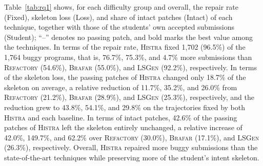 \documentclass[10pt,conference]{IEEEtran}
\begin{document}
Table~\ref{tab:rq1} shows, for each difficulty group and overall, the repair rate (Fixed), skeleton loss (Loss), and share of intact patches (Intact) of each technique, together with those of the students' own accepted submissions (Student); ``--'' denotes no passing patch, and bold marks the best value among the techniques. In terms of the repair rate, \textsc{Histra} fixed 1,702 (96.5\%) of the 1,764 buggy programs, that is, 76.7\%, 75.3\%, and 4.7\% more submissions than \textsc{Refactory} (54.6\%), \textsc{Brafar} (55.0\%), and \textsc{LSGen} (92.2\%), respectively. In terms of the skeleton loss, the passing patches of \textsc{Histra} changed only 18.7\% of the skeleton on average, a relative reduction of 11.7\%, 35.2\%, and 26.0\% from \textsc{Refactory} (21.2\%), \textsc{Brafar} (28.9\%), and \textsc{LSGen} (25.3\%), respectively, and the reduction grew to 43.8\%, 54.1\%, and 29.8\% on the trajectories fixed by both \textsc{Histra} and each baseline. In terms of intact patches, 42.6\% of the passing patches of \textsc{Histra} left the skeleton entirely unchanged, a relative increase of 42.0\%, 149.7\%, and 62.2\% over \textsc{Refactory} (30.0\%), \textsc{Brafar} (17.1\%), and \textsc{LSGen} (26.3\%), respectively. Overall, \textsc{Histra} repaired more buggy submissions than the state-of-the-art techniques while preserving more of the student's intent skeleton.
\end{document}
